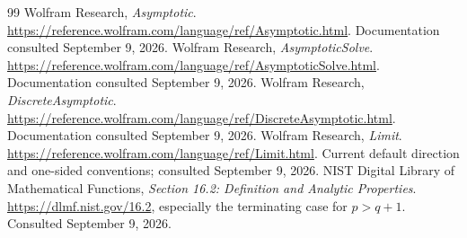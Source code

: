 \documentclass[11pt,a4paper]{article}
\theoremstyle{remark}
\begin{document}
\begin{thebibliography}{99}
 Wolfram Research, \emph{Asymptotic}. \url{https://reference.wolfram.com/language/ref/Asymptotic.html}. Documentation consulted September 9, 2026.
 Wolfram Research, \emph{AsymptoticSolve}. \url{https://reference.wolfram.com/language/ref/AsymptoticSolve.html}. Documentation consulted September 9, 2026.
 Wolfram Research, \emph{DiscreteAsymptotic}. \url{https://reference.wolfram.com/language/ref/DiscreteAsymptotic.html}. Documentation consulted September 9, 2026.
 Wolfram Research, \emph{Limit}. \url{https://reference.wolfram.com/language/ref/Limit.html}. Current default direction and one-sided conventions; consulted September 9, 2026.
 NIST Digital Library of Mathematical Functions, \emph{Section 16.2: Definition and Analytic Properties}. \url{https://dlmf.nist.gov/16.2}, especially the terminating case for $p>q+1$. Consulted September 9, 2026.
\end{thebibliography}
\end{document}
